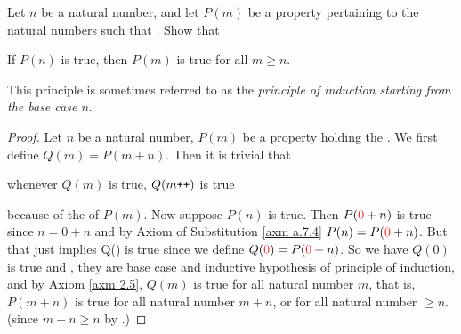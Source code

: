 \setcounter{exercise}{7}
\begin{exercise} \label{exercise 2.2.8}
Let \(n\) be a natural number, and let \(P(m)\) be a property pertaining to the natural numbers such that .  Show that
    \begin{center}
    If \(P(n)\) is true, then \(P(m)\) is true for all \(m \geq n\). 
    \end{center}
This principle is sometimes referred to as the \emph{principle of induction starting from the base case \(n\)}.
\end{exercise}
\begin{proof}
Let \(n\) be a natural number, \(P(m)\) be a property holding the . We first define \(Q(m) = P(m + n)\). Then it is trivial that     \begin{center}
    whenever \(Q(m)\) is true, \(Q(m\texttt{++})\) is true 
    \end{center}
because of the  of \(P(m)\). Now suppose \(P(n)\) is true. Then \(P(\RED{0} + n)\) is true since \(n = 0 + n\) and by Axiom of Substitution \ref{axm a.7.4} \(P(n) = P(\RED{0} + n)\). But that just implies Q() is true since we define \(Q(\RED{0}) = P(\RED{0} + n)\). So we have \(Q(0)\) is true and , they are base case and inductive hypothesis of principle of induction, and by Axiom \ref{axm 2.5}, \(Q(m)\) is true for all natural number \(m\), that is, \(P(m + n)\) is true for all natural number \(m + n\), or for all natural number \(\geq n\). (since \(m + n \geq n\) by .)
\end{proof}